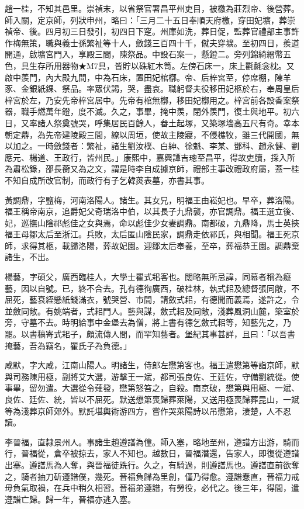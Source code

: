 \begin{pinyinscope}
趙一桂，不知其邑里。崇禎末，以省祭官署昌平州吏目，被檄為莊烈帝、後營葬。師入關，定京師，列狀申州，略曰：「三月二十五日奉順天府檄，穿田妃壙，葬崇禎帝、後。四月初三日發引，初四日下窆。州庫如洗，葬日促，監葬官禮部主事許作梅無策，職與義士孫繁祉等十人，斂錢三百四十千，僦夫穿壙。至初四日，羨道開通，啟壙宮門入，享殿三間，陳祭品。中設石案一，懸鐙二。旁列錦綺繒幣五色，具生存所用器物★M7具，皆貯以硃紅木笥。左傍石床一，床上氍毹衾枕。又啟中羨門，內大殿九間，中為石床，置田妃棺槨。帝、后梓宮至，停席棚，陳羊豕、金銀紙錁、祭品。率眾伏謁，哭，盡哀。職躬督夫役移田妃柩於右，奉周皇后梓宮於左，乃安先帝梓宮居中。先帝有棺無槨，移田妃槨用之。梓宮前各設香案祭器，職手燃萬年鐙，度不滅。久之，事畢，掩中羨，閉外羨門，復土與地平。初六日，又率諸人祭奠號哭，呼集居民百餘人，畚土起塚，又築塚墻高五尺有奇。幸本朝定鼎，為先帝建陵殿三間，繚以周垣，使故主陵寢，不侵樵牧，雖三代開國，無以加之。一時斂錢者：繁祉，諸生劉汝樸、白紳、徐魁、李某、鄧科、趙永健、劉應元、楊道、王政行，皆州民。」康熙中，嘉興譚吉璁至昌平，得故吏牘，採入所為肅松錄，邵長蘅又為之文，謂是時李自成據京師，禮部主事改禮政府屬，蓋一桂不知自成所改官制，而政行有子乞韓菼表墓，亦書其事。

黃調鼎，字鹽梅，河南洛陽人。諸生。其女兄，明福王由崧妃也。早卒，葬洛陽。福王稱帝南京，追爵妃父奇瑞洛中伯，以其長子九鼎襲，亦官調鼎。福王選立後、妃，巡撫山陰祁彪佳之女與焉，命以彪佳少女妻調鼎。南都破，九鼎降，馬士英挾福王母鄒太后至浙江。兵敗，太后匿山陰民家，調鼎走依祁氏，與相聞。福王死京師，求得其柩，載歸洛陽，葬故妃園。迎鄒太后奉養，至卒，葬福恭王園。調鼎棄諸生，不出。

楊藝，字碩父，廣西臨桂人，大學士瞿式耜客也。闊略無所忌諱，同幕者稱為癡藝，因以自號。已，終不合去。孔有德徇廣西，破桂林，執式耜及總督張同敞，不屈死，藝衰絰懸紙錢滿衣，號哭營、市間，請斂式耜，有德聞而義焉，遂許之，令並斂同敞。有姚端者，式耜門人。藝與謀，斂式耜及同敞，淺葬風洞山麓，築室於旁，守墓不去。時明給事中金堡去為僧，將上書有德乞斂式耜等，知藝先之，乃罷。以書稿寄式耜子，頗流傳人間，而罕知藝者。堡紀其事甚詳，且曰：「以吾書掩藝，吾為竊名，瞿氏子為負德。」

咸默，字大咸，江南山陽人。明諸生，侍郎左懋第客也。福王遣懋第等詣京師，默與司務陳用極，副將艾大選，游擊王一斌，都司張良佐、王廷佐，守備劉統從。使事畢，留勿遣。大選從令薙發，懋第怒笞之，自殺。南京破，懋第與用極、一斌、良佐、廷佐、統，皆以不屈死。默送懋第喪歸葬萊陽，又送用極喪歸葬昆山，一斌等為淺葬京師郊外。默託堪輿術游四方，嘗作哭萊陽詩以吊懋第，淒楚，人不忍讀。

李晉福，直隸景州人。事諸生趙遵譜為僮。師入塞，略地至州，遵譜方出游，騎而行，晉福從，倉卒被掠去，家人不知也。越數日，晉福潛還，告家人，即復從遵譜出塞。遵譜馬為人奪，與晉福徒跣行。久之，有騎過，則遵譜馬也。遵譜直前欲奪之，騎者抽刀斫遵譜僕，幾死。晉福負歸為里創，僅乃得愈。遵譜惷直，晉福力戒毋負氣取禍，在兵中稍久相習。晉福弟遵譜，有勞役，必代之。後三年，得間，遣遵譜亡歸。歸一年，晉福亦逃入塞。


\end{pinyinscope}
